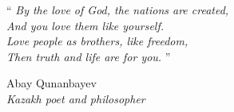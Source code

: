 \documentclass[
12pt, %
oneside, %
english, %
doublespacing, %
doublespacing, %
toctotoc, %
parskip, %
headsepline, %
]{MastersDoctoralThesis} %
\begin{document}
\cleardoublepage


\vspace*{0.2\textheight}

\noindent\enquote{\itshape 
By the love of God, the nations are created, \\
And you love them like yourself.\\
 Love people as brothers, like freedom,\\
  Then truth and life are for you.
}


 \begin{flushright}
  Abay Qunanbayev\\
 \textit{Kazakh poet and philosopher}
 \end{flushright}
\cleardoublepage
\end{document}
